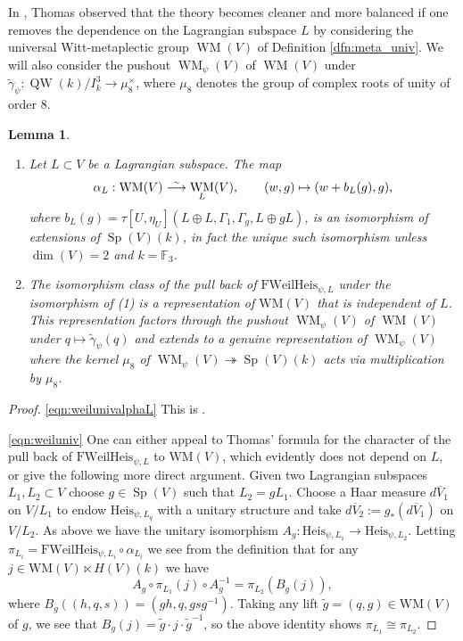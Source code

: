 \documentclass{article}
\def\tx#1{\textrm{#1}}
\def\F{\mathbb{F}}
\def\ol#1{\overline{#1}}
\def\simto{\buildrel\hbox{\tiny{$\sim$}}\over\longrightarrow}
\DeclareMathOperator{\Sp}{Sp}
\newtheorem{lem}[thm]{Lemma}
\theoremstyle{definition}
\numberwithin{equation}{subsection}
\renewcommand{\-}{\hyp{}}
\DeclareMathOperator{\WM}{WM}
\newcommand{\WMuniv}{\mathrm{WM}}
\DeclareMathOperator{\QW}{QW}
\begin{document}
\begin{appendices}
In \cite{Thomas2013}, Thomas observed that the theory becomes cleaner and more balanced if one removes the dependence on the Lagrangian subspace $L$ by considering the universal Witt-metaplectic group $\WM(V)$ of Definition \ref{dfn:meta_univ}. We will also consider the pushout $\WM_\psi(V)$\index[notation]{WMpsi@$\WM_\psi$} of $\WM(V)$ under $\tilde\gamma_\psi : \QW(k)/I_k^3 \to \mu_8^\times$, where $\mu_8$ denotes the group of complex roots of unity of order $8$.

\begin{lem} \label{lem:weil_univ}
	\begin{enumerate}
		\item  \label{eqn:weilunivalphaL} Let $L \subset V$ be a Lagrangian subspace. The map
		\[ \alpha_L : \WMuniv(V) \simto \WM_L(V),\qquad (w,g) \mapsto (w+b_L(g),g),  \]
		where $b_L(g)=\tau[U,\eta_U](L \oplus L,\Gamma_1,\Gamma_g,L \oplus gL)$, is an isomorphism of extensions of $\Sp(V)(k)$, in fact the unique such isomorphism unless $\dim(V)=2$ and $k=\F_3$.
		\item \label{eqn:weiluniv} The isomorphism class of the pull back of $\mathrm{FWeilHeis}_{\psi,L}$ under the isomorphism of (1) is a representation of $\WMuniv(V)$ that is independent of $L$. This representation factors through the pushout $\WM_\psi(V)$ of $\WM(V)$ under $q\mapsto \tilde\gamma_\psi(q)$ and extends to a genuine representation of $\WM_\psi(V)$ where the kernel $\mu_8$ of $\WM_\psi(V) \twoheadrightarrow \Sp(V)(k)$ acts via multiplication by $\mu_8$.
	\end{enumerate}
\end{lem}
\begin{proof}
	\eqref{eqn:weilunivalphaL} This is \cite[Proposition 3.4]{Thomas2013}.

	\eqref{eqn:weiluniv} One can either appeal to Thomas' formula \cite[Theorem B]{Thomas2013} for the character of the pull back of $\mathrm{FWeilHeis}_{\psi,L}$ to $\WMuniv(V)$, which evidently does not depend on $L$, or give the following more direct argument. Given two Lagrangian subspaces $L_1,L_2 \subset V$ choose $g \in \Sp(V)$ such that $L_2=gL_1$. Choose a Haar measure $d\ol{V}_1$ on $V/L_1$ to endow $\tx{Heis}_{\psi,L_q}$ with a unitary structure and take $d\ol{V}_2:=g_*(d\ol{V}_1)$ on $V/L_2$. As above we have the unitary isomorphism $A_g : \tx{Heis}_{\psi,L_1} \to \tx{Heis}_{\psi,L_2}$. Letting $\pi_{L_i}=\mathrm{FWeilHeis}_{\psi,L_i}\circ\alpha_{L_i}$ we see from the definition that for any $j \in \WMuniv(V) \ltimes H(V)(k) $ we have
	\[ A_g \circ \pi_{L_1}(j) \circ A_g^{-1} = \pi_{L_2}(B_g(j)), \]
	where $B_g((h,q,s))=(gh,q,gsg^{-1})$. Taking any lift $\tilde g=(q,g) \in \WMuniv(V)$ of $g$, we see that $B_g(j)=\tilde g \cdot j \cdot \tilde g^{-1}$, so the above identity shows $\pi_{L_1} \cong \pi_{L_2}$.
	

\end{proof}
\end{appendices}
\end{document}
